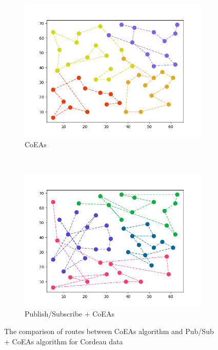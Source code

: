 \documentclass[conference]{IEEEtran}
\begin{document}
\begin{figure}[!]
	\centering
	\begin{subfigure}[t]{0.5\textwidth}
		\centering
		\includegraphics[width=\textwidth]{Resources/Images/test_result_normal_cordeau_coes_paper}
		\caption{CoEAs}
		\label{fig:test_result_normal_cordeau_coes_paper}
	\end{subfigure}%
	~ 
	\begin{subfigure}[t]{0.5\textwidth}
		\centering
		\includegraphics[width=\textwidth]{Resources/Images/test_result_normal_cordeau_pubsub_coes_paper}
		\caption{Publish/Subscribe + CoEAs}
		\label{fig:test_result_normal_cordeau_pubsub_coes_paper}
	\end{subfigure}
	\caption{The comparison of routes between CoEAs algorithm and Pub/Sub + CoEAs algorithm for Cordeau data}
	\label{fig:test_result_normal_cordeau_comparison}
\end{figure}
\end{document}
